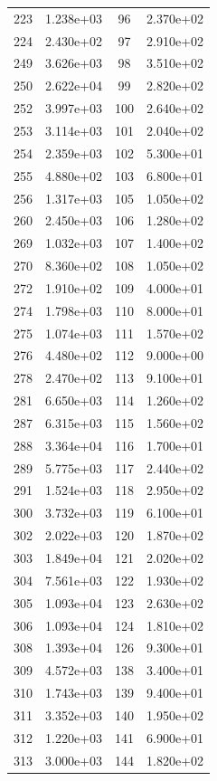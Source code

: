 \documentclass[12pt]{article}
\begin{document}
\begin{longtable}{@{}cccc@{}}
223 & 1.238e+03 & 96 & 2.370e+02 \\
224 & 2.430e+02 & 97 & 2.910e+02 \\
249 & 3.626e+03 & 98 & 3.510e+02 \\
250 & 2.622e+04 & 99 & 2.820e+02 \\
252 & 3.997e+03 & 100 & 2.640e+02 \\
253 & 3.114e+03 & 101 & 2.040e+02 \\
254 & 2.359e+03 & 102 & 5.300e+01 \\
255 & 4.880e+02 & 103 & 6.800e+01 \\
256 & 1.317e+03 & 105 & 1.050e+02 \\
260 & 2.450e+03 & 106 & 1.280e+02 \\
269 & 1.032e+03 & 107 & 1.400e+02 \\
270 & 8.360e+02 & 108 & 1.050e+02 \\
272 & 1.910e+02 & 109 & 4.000e+01 \\
274 & 1.798e+03 & 110 & 8.000e+01 \\
275 & 1.074e+03 & 111 & 1.570e+02 \\
276 & 4.480e+02 & 112 & 9.000e+00 \\
278 & 2.470e+02 & 113 & 9.100e+01 \\
281 & 6.650e+03 & 114 & 1.260e+02 \\
287 & 6.315e+03 & 115 & 1.560e+02 \\
288 & 3.364e+04 & 116 & 1.700e+01 \\
289 & 5.775e+03 & 117 & 2.440e+02 \\
291 & 1.524e+03 & 118 & 2.950e+02 \\
300 & 3.732e+03 & 119 & 6.100e+01 \\
302 & 2.022e+03 & 120 & 1.870e+02 \\
303 & 1.849e+04 & 121 & 2.020e+02 \\
304 & 7.561e+03 & 122 & 1.930e+02 \\
305 & 1.093e+04 & 123 & 2.630e+02 \\
306 & 1.093e+04 & 124 & 1.810e+02 \\
308 & 1.393e+04 & 126 & 9.300e+01 \\
309 & 4.572e+03 & 138 & 3.400e+01 \\
310 & 1.743e+03 & 139 & 9.400e+01 \\
311 & 3.352e+03 & 140 & 1.950e+02 \\
312 & 1.220e+03 & 141 & 6.900e+01 \\
313 & 3.000e+03 & 144 & 1.820e+02 \\

\end{longtable}
\end{document}

